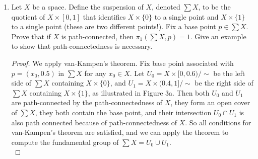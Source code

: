 \documentclass{article}
\begin{document}
\begin{enumerate}[label={\bf Q\arabic*:}]
\begin{enumerate}
      \item Let $L_1,\ldots,L_k$ be distinct non-intersecting lines in
        $\mathbb{R}^3$ and let $q\in\mathbb{R}^3\setminus(L_1\cup\ldots\cup
        L_k)$ be a base point. Calculate a presentation for the group
        $\pi_1(\mathbb{R}^3\setminus(L_1\cup\ldots\cup L_k),q)$.

        \begin{proof}
          Note that the base point $q$ does not matter since the space is
          connected. The space $X=\mathbb{R}^3\setminus\{L_1\cup\ldots\cup
          L_k\}$ for non-intersecting $L_i$'s is a deformation retract to
          space $X'=\mathbb{R}^3\setminus\{L_1'\cup\ldots\cup L_k'\}$,
          where the $L_i'$ are parallel lines. $X'$ is a deformation
          retract to the cylinder containing $k$ hollow and parallel tubes.
          Making the height of this cylinder and the radius of the tubes
          arbitrarily small, the cylinder is a deformation retract of $S^2$
          minus $k$ points, which we have shown in the previous part of
          this question to have a fundamental group of $F_k$. Hence
          \begin{align*}
            \pi_1(\mathbb{R}^3\setminus\{L_1\cup\ldots\cup L_k\},q) &=F_k \\
              &=\langle a_1,\ldots,a_k\; |\; \rangle. \\
          \end{align*}
        \end{proof}
    \end{enumerate}

  \item Let $X$ be a space. Define the suspension of $X$, denoted $\sum X$,
    to be the quotient of $X\times[0,1]$ that identifies $X\times\{0\}$ to
    a single point and $X\times\{1\}$ to a single point (these are two
    different points!). Fix a base point $p\in\sum X$. Prove that if $X$ is
    path-connected, then $\pi_1(\sum X,p)=1$. Give an example to show that
    path-connectedness is necessary. 

    \begin{proof}
      We apply van-Kampen's theorem. Fix base point associated with
      $p=(x_0,0.5)$ in $\sum X$ for any $x_0\in X$. Let
      $U_0=X\times[0,0.6)/\sim$ be the left side of $\sum X$ containing
      $X\times\{0\}$, and $U_1=X\times(0.4,1]/\sim$ be the right side of
      $\sum X$ containing $X\times\{1\}$, as illustrated in Figure 3a. Then
      both $U_0$ and $U_1$ are path-connected by the path-connectedness of
      $X$, they form an open cover of $\sum X$, they both contain the base
      point, and their intersection $U_0\cap U_1$ is also path connected
      because of path-connectedness of $X$. So all conditions for
      van-Kampen's theorem are satisfied, and we can apply the theorem to
      compute the fundamental group of $\sum X=U_0\cup U_1$. \\


\end{proof}
\end{enumerate}
\end{document}
